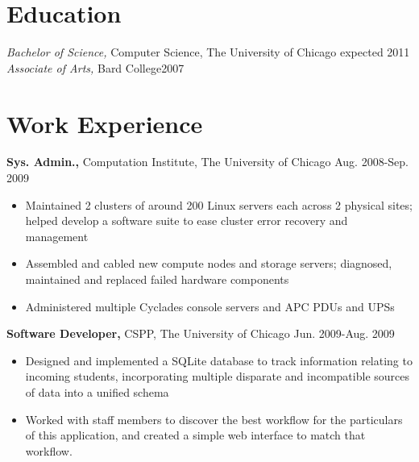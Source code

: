 \documentclass[line,overlapped]{res}
\begin{document}
 
 
 
\address{jalewis@uchicago.edu \hspace{2.3in} Current: 1151 E. 61th St. Apt. 1E, Chicago, IL 60637}
\address{(917) 974-7144 \hspace{2.81in} Permananent: 6 Warren Place, Brooklyn, NY 11201}

 
\newsectionwidth{.2in}
\begin{resume} 
 
\section{Education} 
{\sl Bachelor of Science,} Computer Science, The University of Chicago \hfill expected 2011\\
{\sl Associate of Arts,} Bard College\hfill 2007

\section{Work Experience}
{\bf Sys. Admin.,} Computation Institute, The University of Chicago \hfill Aug. 2008-Sep. 2009
\begin{itemize} \itemsep -2pt %
    \item Maintained 2 clusters of around 200 Linux servers each across 2 physical sites; helped develop a software suite to ease cluster error recovery and management
    \item Assembled and cabled new compute nodes and storage servers; diagnosed, maintained and replaced failed hardware components
    \item Administered multiple Cyclades console servers and APC PDUs and UPSs
\end{itemize} \itemsep -2pt
\vspace{-10pt}
{\bf Software Developer,} CSPP, The University of Chicago \hfill Jun. 2009-Aug. 2009
\begin{itemize}
    \item Designed and implemented a SQLite database to track information relating to incoming students, incorporating multiple disparate and incompatible sources of data into a unified schema
    \item Worked with staff members to discover the best workflow for the particulars of this application, and created a simple web interface to match that workflow.
\end{itemize}
\vspace{-10pt}


\end{resume}
\end{document}
